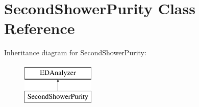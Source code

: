 \hypertarget{classSecondShowerPurity}{}\section{Second\+Shower\+Purity Class Reference}
\label{classSecondShowerPurity}
Inheritance diagram for Second\+Shower\+Purity\+:\begin{figure}[H]
\begin{center}
\leavevmode
\includegraphics[height=2.000000cm]{classSecondShowerPurity}
\end{center}
\end{figure}
